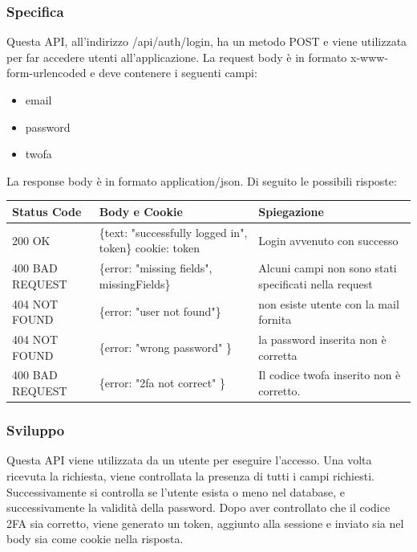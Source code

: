 \documentclass{report}
\begin{document}
\subsubsection*{Specifica}
Questa API, all'indirizzo /api/auth/login, ha un metodo POST e viene utilizzata per far accedere utenti all'applicazione.
La request body è in formato x-www-form-urlencoded e deve contenere i seguenti campi:
\begin{itemize}
	\item email
	\item password
	\item twofa
\end{itemize}
La response body è in formato application/json. Di seguito le possibili risposte:
\begin{center} %
	\centering
	\begin{tabular}{ |p{4cm}|p{5cm}|p{4cm}| }
		\hline
		\centering Status Code & \qquad\quad Body e Cookie & \qquad\qquad Spiegazione\\ %
		\hline
		200 OK & \{text: "successfully logged in", token\} cookie: token & Login avvenuto con successo 	\\
		\hline
		400 BAD REQUEST & \{error: "missing fields", missingFields\} & Alcuni campi non sono stati specificati nella request\\ %
		\hline
		404 NOT FOUND & \{error: "user not found"\} & non esiste utente con la mail fornita \\%
		\hline
		404 NOT FOUND & \{error: "wrong password" \} & la password inserita non è corretta \\
		\hline
		400 BAD REQUEST & \{error: "2fa not correct" \} & Il codice twofa inserito non è corretto. \\
		\hline
	\end{tabular}
\end{center}

\subsubsection*{Sviluppo}
Questa API viene utilizzata da un utente per eseguire l'accesso.
Una volta ricevuta la richiesta, viene controllata la presenza di tutti i campi richiesti.
Successivamente si controlla se l'utente esista o meno nel database, e successivamente la validità della password.
Dopo aver controllato che il codice 2FA sia corretto, viene generato un token, aggiunto alla sessione e inviato sia nel body sia come cookie nella risposta.
\end{document}

